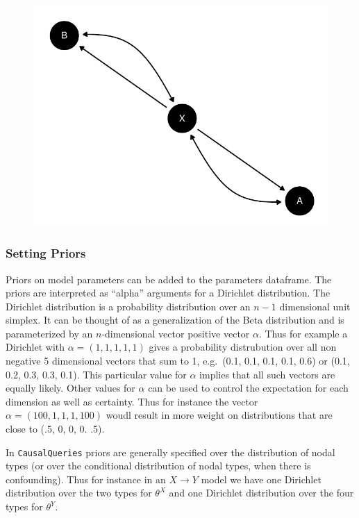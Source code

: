 \documentclass[
  article]{jss}
\begin{document}
\begin{figure}[H]

{\centering \includegraphics{paper_files/figure-pdf/unnamed-chunk-44-1.pdf}

}

\end{figure}

\hypertarget{priors}{%
\subsubsection{Setting Priors}\label{priors}}

Priors on model parameters can be added to the parameters dataframe. The
priors are interpreted as ``alpha'' arguments for a Dirichlet
distribution. The Dirichlet distribution is a probability distribution
over an \(n-1\) dimensional unit simplex. It can be thought of as a
generalization of the Beta distribution and is parameterized by an
\(n\)-dimensional vector positive vector \(\alpha\). Thus for example a
Dirichlet with \(\alpha = (1, 1, 1, 1, 1)\) gives a probability
distrubution over all non negative 5 dimensional vectors that sum to 1,
e.g.~(0.1, 0.1, 0.1, 0.1, 0.6) or (0.1, 0.2, 0.3, 0.3, 0.1). This
particular value for \(\alpha\) implies that all such vectors are
equally likely. Other values for \(\alpha\) can be used to control the
expectation for each dimension as well as certainty. Thus for instance
the vector \(\alpha = (100, 1, 1, 1, 100)\) woudl result in more weight
on distributions that are close to (.5, 0, 0, 0. .5).

In \texttt{CausalQueries} priors are generally specified over the
distribution of nodal types (or over the conditional distribution of
nodal types, when there is confounding). Thus for instance in an
\(X \rightarrow Y\) model we have one Dirichlet distribution over the
two types for \(\theta^X\) and one Dirichlet distribution over the four
types for \(\theta^Y\).
\end{document}
